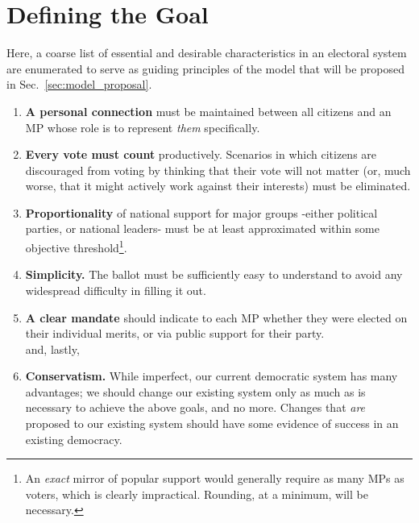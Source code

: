 \documentclass[DIV=calc, paper=a4, fontsize=11pt, twocolumn]{scrartcl}	 %
\begin{document}
\section{Defining the Goal}
\label{sec:goal_list}

Here, a coarse list of essential and desirable characteristics in an electoral system are enumerated to serve as guiding principles of the model that will be proposed in Sec.~\ref{sec:model_proposal}.  
\begin{enumerate}
\item \textbf{A personal connection} must be maintained between all citizens and an MP whose role is to represent \emph{them} specifically.   
\item \textbf{Every vote must count} productively. Scenarios in which citizens are discouraged from voting by thinking that their vote will not matter (or, much worse, that it might actively work against their interests) must be eliminated.
\item \textbf{Proportionality} of national support for major groups \--either political parties, or national leaders\-- must be at least approximated within some objective threshold\footnote{
An \emph{exact} mirror of popular support would generally require as many MPs as voters, which is clearly impractical. Rounding, at a minimum, will be necessary.
}. 
\item   \textbf{Simplicity.} The ballot must be sufficiently easy to understand to avoid any widespread difficulty in filling it out. 

\item  \textbf{A clear mandate} should indicate to each MP whether they were elected on their individual merits, or via public support for their party.
\\
and, lastly, 
\item \textbf{Conservatism.} While imperfect, our current democratic system has many advantages; we should change our existing system only as much as is necessary to achieve the above goals, and no more. Changes that \emph{are} proposed to our existing system should have some evidence of success in an existing democracy.
\end{enumerate}

\end{document}
